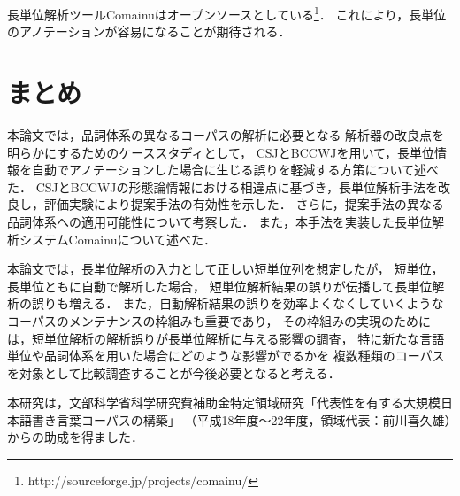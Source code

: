 \documentclass[japanese]{jnlp_1.4}
\begin{document}
長単位解析ツールComainuはオープンソースとしている\footnote{http://sourceforge.jp/projects/comainu/}．
これにより，長単位のアノテーションが容易になることが期待される．


\section{まとめ}
\label{conclusion}

本論文では，品詞体系の異なるコーパスの解析に必要となる
解析器の改良点を明らかにするためのケーススタディとして，
CSJとBCCWJを用いて，長単位情報を自動でアノテーションした場合に生じる誤りを軽減する方策について述べた．
CSJとBCCWJの形態論情報における相違点に基づき，長単位解析手法を改良し，評価実験により提案手法の有効性を示した．
さらに，提案手法の異なる品詞体系への適用可能性について考察した．
また，本手法を実装した長単位解析システムComainuについて述べた．

本論文では，長単位解析の入力として正しい短単位列を想定したが，
短単位，長単位ともに自動で解析した場合，
短単位解析結果の誤りが伝播して長単位解析の誤りも増える．
また，自動解析結果の誤りを効率よくなくしていくようなコーパスのメンテナンスの枠組みも重要であり，
その枠組みの実現のためには，短単位解析の解析誤りが長単位解析に与える影響の調査，
特に新たな言語単位や品詞体系を用いた場合にどのような影響がでるかを
複数種類のコーパスを対象として比較調査することが今後必要となると考える．


\acknowledgment
本研究は，文部科学省科学研究費補助金特定領域研究「代表性を有する大規模日本語書き言葉コーパスの構築」
（平成18年度〜22年度，領域代表：前川喜久雄）からの助成を得ました．
\end{document}
